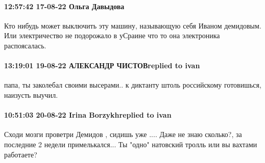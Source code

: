  
 
 
 
 

\paragraph{12:57:42 17-08-22 Ольга Давыдова}

Кто нибудь может выключить эту машину, называющую себя Иваном демидовым. Или
электричество не подорожало в уСраине что то она электроника распоясалась.

\paragraph{13:19:01 19-08-22 АЛЕКСАНДР ЧИСТОВreplied to ivan}

папа, ты заколебал своими высерами.. к диктанту штоль российскому готовишься,
наизусть выучил.

\paragraph{10:51:03 20-08-22 Irina Borzykhreplied to ivan}

Сходи мозги проветри Демидов , сидишь уже .... Даже не знаю сколько?, за
последние 2 недели примелькался... Ты "одно" натовский тролль или вы вахтами
работаете?
